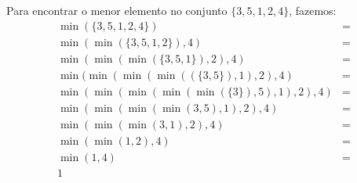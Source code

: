 \documentclass{article}
\begin{document}
\begin{enumerate}
	      Para encontrar o menor elemento no conjunto \( \{3,5,1,2,4\} \),
	      fazemos:
	      \begin{align*}
		      \min(\{3,5,1,2,4\})                         & = \\
		      \min(\min(\{3,5,1,2\}),4)                   & = \\
		      \min(\min(\min(\{3,5,1\}),2),4)             & = \\
		      \min(\min(\min(\min((\{3,5\}),1),2),4)      & = \\
		      \min(\min(\min(\min(\min(\{3\}),5),1),2),4) & = \\
		      \min(\min(\min(\min(3,5),1),2),4)           & = \\
		      \min(\min(\min(3,1),2),4)                   & = \\
		      \min(\min(1,2),4)                           & = \\
		      \min(1,4)                                   & = \\
		      1
	      \end{align*}


\end{enumerate}
\end{document}
